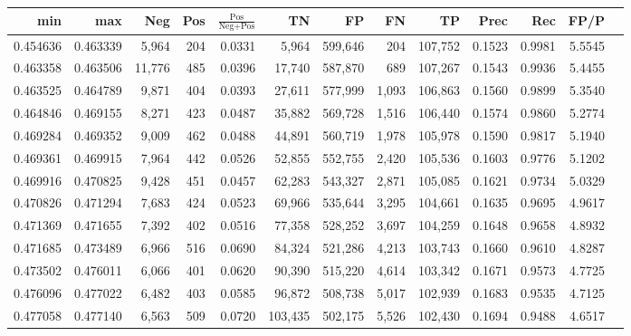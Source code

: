 \begin{tabular}{rrrrrrrrrrrrr}
\toprule
     min &      max &    Neg &   Pos & $\frac{\text{Pos}}{\text{Neg}+\text{Pos}}$ &      TN &      FP &      FN &      TP &   Prec &    Rec &   FP/P \\
\midrule
0.454636 & 0.463339 &  5,964 &   204 &                                     0.0331 &   5,964 & 599,646 &     204 & 107,752 & 0.1523 & 0.9981 & 5.5545 \\
0.463358 & 0.463506 & 11,776 &   485 &                                     0.0396 &  17,740 & 587,870 &     689 & 107,267 & 0.1543 & 0.9936 & 5.4455 \\
0.463525 & 0.464789 &  9,871 &   404 &                                     0.0393 &  27,611 & 577,999 &   1,093 & 106,863 & 0.1560 & 0.9899 & 5.3540 \\
0.464846 & 0.469155 &  8,271 &   423 &                                     0.0487 &  35,882 & 569,728 &   1,516 & 106,440 & 0.1574 & 0.9860 & 5.2774 \\
0.469284 & 0.469352 &  9,009 &   462 &                                     0.0488 &  44,891 & 560,719 &   1,978 & 105,978 & 0.1590 & 0.9817 & 5.1940 \\
0.469361 & 0.469915 &  7,964 &   442 &                                     0.0526 &  52,855 & 552,755 &   2,420 & 105,536 & 0.1603 & 0.9776 & 5.1202 \\
0.469916 & 0.470825 &  9,428 &   451 &                                     0.0457 &  62,283 & 543,327 &   2,871 & 105,085 & 0.1621 & 0.9734 & 5.0329 \\
0.470826 & 0.471294 &  7,683 &   424 &                                     0.0523 &  69,966 & 535,644 &   3,295 & 104,661 & 0.1635 & 0.9695 & 4.9617 \\
0.471369 & 0.471655 &  7,392 &   402 &                                     0.0516 &  77,358 & 528,252 &   3,697 & 104,259 & 0.1648 & 0.9658 & 4.8932 \\
0.471685 & 0.473489 &  6,966 &   516 &                                     0.0690 &  84,324 & 521,286 &   4,213 & 103,743 & 0.1660 & 0.9610 & 4.8287 \\
0.473502 & 0.476011 &  6,066 &   401 &                                     0.0620 &  90,390 & 515,220 &   4,614 & 103,342 & 0.1671 & 0.9573 & 4.7725 \\
0.476096 & 0.477022 &  6,482 &   403 &                                     0.0585 &  96,872 & 508,738 &   5,017 & 102,939 & 0.1683 & 0.9535 & 4.7125 \\
0.477058 & 0.477140 &  6,563 &   509 &                                     0.0720 & 103,435 & 502,175 &   5,526 & 102,430 & 0.1694 & 0.9488 & 4.6517 \\

\end{tabular}

